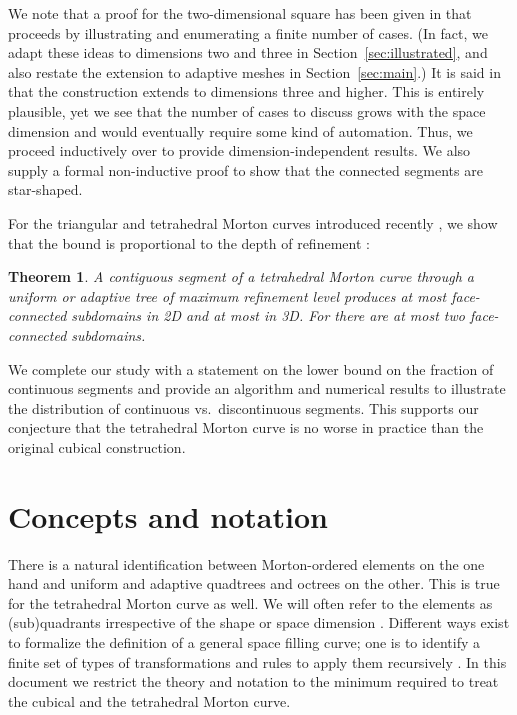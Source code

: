\documentclass[a4paper,11pt]{article}
\newcommand{\seclab}[1]{\label{sec:#1}}
\newcommand{\secref}[1]{Section~\ref{sec:#1}}
\newtheorem{thm}{Theorem}
\begin{document}
We note that a proof for the two-dimensional square has been given in
\cite[pages 175--177]{Bader12} that proceeds by illustrating and enumerating a
finite number of cases.
(In fact, we adapt these ideas to dimensions two and three in
\secref{illustrated}, and also restate the extension to adaptive meshes in
\secref{main}.)
It is said in \cite{Bader12} that the construction extends to dimensions three
and higher.
This is entirely plausible, yet we see that the number of cases to discuss
grows with the space dimension and would eventually require some kind of
automation.
Thus, we proceed inductively over  to provide dimension-independent
results.
We also supply a formal non-inductive proof to show that the
connected segments are star-shaped.

For the triangular and tetrahedral Morton curves introduced recently
\cite{BursteddeHolke16}, we show that the bound is proportional to the depth of
refinement :
\begin{thm}
  \label{illthmalltets}
  A contiguous segment of a tetrahedral Morton curve through a uniform or
  adaptive tree of maximum refinement level  produces at most 
  face-connected subdomains in 2D and at most  in 3D.
  For  there are at most two face-connected subdomains.
\end{thm}

We complete our study with a statement on the lower bound on the fraction of
continuous segments and provide an algorithm and numerical results to
illustrate the distribution of continuous vs.\ discontinuous segments.
This supports our conjecture that the tetrahedral Morton curve is no worse in
practice than the original cubical construction.





\section{Concepts and notation}
\seclab{concepts}

There is a natural identification between Morton-ordered elements on the one
hand and uniform and adaptive quadtrees \cite{FinkelBentley74} and octrees
\cite{Meagher82} on the other.
This is true for the tetrahedral Morton curve \cite{BursteddeHolke16} as well.
We will often refer to the elements as (sub)quadrants irrespective of the shape
or space dimension .
Different ways exist to formalize the definition of a general space filling
curve; one is to identify a finite set of types of transformations and rules to
apply them recursively \cite{HaverkortWalderveen10}.
In this document we restrict the theory and notation to the minimum required to
treat the cubical and the tetrahedral Morton curve.
\end{document}
